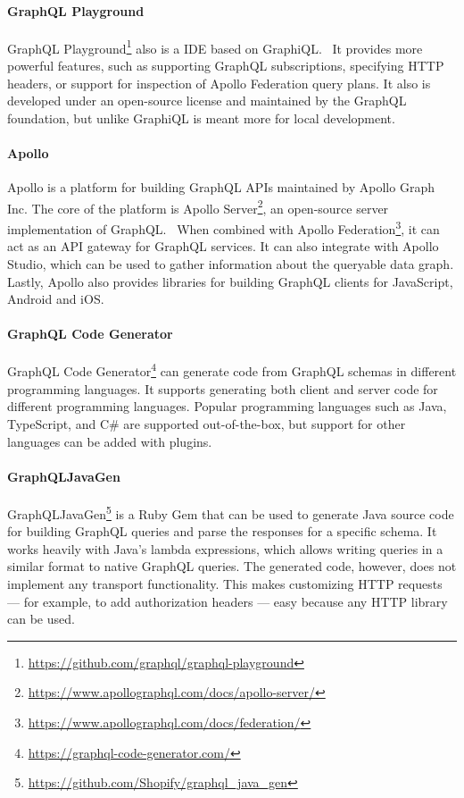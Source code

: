 \paragraph{GraphQL Playground}

GraphQL Playground\footnote{\url{https://github.com/graphql/graphql-playground}} also is a \ac{IDE} based on GraphiQL.~%
It provides more powerful features, such as supporting GraphQL subscriptions, specifying \ac{HTTP} headers, or support for inspection of Apollo Federation query plans.
It also is developed under an open-source license and maintained by the GraphQL foundation, but unlike GraphiQL is meant more for local development.

\paragraph{Apollo}

Apollo is a platform for building GraphQL \acp{API} maintained by Apollo Graph Inc.
The core of the platform is Apollo Server\footnote{\url{https://www.apollographql.com/docs/apollo-server/}}, an open-source server implementation of GraphQL.~%
When combined with Apollo Federation\footnote{\url{https://www.apollographql.com/docs/federation/}}, it can act as an \ac{API} gateway for GraphQL services.
It can also integrate with Apollo Studio, which can be used to gather information about the queryable data graph.
Lastly, Apollo also provides libraries for building GraphQL clients for JavaScript, Android and iOS.%

\paragraph{GraphQL Code Generator}

GraphQL Code Generator\footnote{\url{https://graphql-code-generator.com/}} can generate code from GraphQL schemas in different programming languages.
It supports generating both client and server code for different programming languages.
Popular programming languages such as Java, TypeScript, and C\# are supported out-of-the-box, but support for other languages can be added with plugins.

\paragraph{GraphQLJavaGen}

GraphQLJavaGen\footnote{\url{https://github.com/Shopify/graphql_java_gen}} is a Ruby Gem that can be used to generate Java source code for building GraphQL queries and parse the responses for a specific schema.
It works heavily with Java's lambda expressions, which allows writing queries in a similar format to native GraphQL queries.
The generated code, however, does not implement any transport functionality.
This makes customizing \ac{HTTP} requests --- for example, to add authorization headers --- easy because any \ac{HTTP} library can be used.